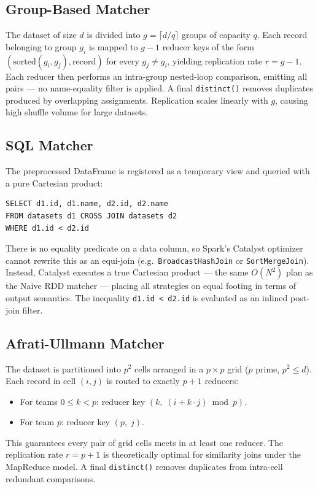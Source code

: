 \documentclass[11pt,a4paper]{article}
\begin{document}
\subsection*{Group-Based Matcher}
The dataset of size $d$ is divided into $g = \lceil d/q \rceil$ groups of capacity $q$. Each record belonging to group $g_i$ is mapped to $g-1$ reducer keys of the form $(\text{sorted}(g_i, g_j), \text{record})$ for every $g_j \neq g_i$, yielding replication rate $r = g-1$. Each reducer then performs an intra-group nested-loop comparison, emitting all pairs — no name-equality filter is applied. A final \texttt{distinct()} removes duplicates produced by overlapping assignments. Replication scales linearly with $g$, causing high shuffle volume for large datasets.

\subsection*{SQL Matcher}
The preprocessed DataFrame is registered as a temporary view and queried with a pure Cartesian product:
\begin{lstlisting}[caption=SQL Matcher Query]
SELECT d1.id, d1.name, d2.id, d2.name
FROM datasets d1 CROSS JOIN datasets d2
WHERE d1.id < d2.id
\end{lstlisting}
There is no equality predicate on a data column, so Spark's Catalyst optimizer cannot rewrite this as an equi-join (e.g.\ \texttt{BroadcastHashJoin} or \texttt{SortMergeJoin}). Instead, Catalyst executes a true Cartesian product — the same $O(N^2)$ plan as the Naive RDD matcher — placing all strategies on equal footing in terms of output semantics. The inequality \texttt{d1.id < d2.id} is evaluated as an inlined post-join filter.

\subsection*{Afrati-Ullmann Matcher}
The dataset is partitioned into $p^2$ cells arranged in a $p \times p$ grid ($p$ prime, $p^2 \le d$). Each record in cell $(i, j)$ is routed to exactly $p+1$ reducers:
\begin{itemize}
    \item For teams $0 \le k < p$: reducer key $(k,\; (i + k \cdot j) \bmod p)$.
    \item For team $p$: reducer key $(p,\; j)$.
\end{itemize}
This guarantees every pair of grid cells meets in at least one reducer. The replication rate $r = p+1$ is theoretically optimal for similarity joins under the MapReduce model. A final \texttt{distinct()} removes duplicates from intra-cell redundant comparisons.
\end{document}
